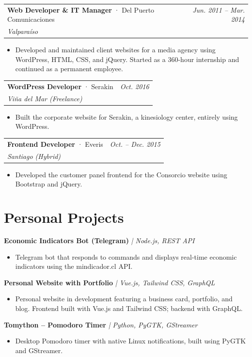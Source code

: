 \documentclass[11pt, a4paper]{article}
\makeatletter
\newcommand{\entry}[4]{%
  \vspace{6pt}
  \begin{tabularx}{\textwidth}{@{}X r@{}}
    \textbf{#1} \textcolor{gris}{· #2} & \textcolor{grisClaro}{\small\textit{#4}} \\
    \textcolor{grisClaro}{\small\textit{#3}} & \\
  \end{tabularx}
  \vspace{2pt}
}
\newcommand{\project}[2]{%
  \vspace{6pt}
  \textbf{#1} \quad \textcolor{gris}{\small\textit{| #2}}
  \vspace{2pt}
}
\makeatother
\begin{document}
\entry{Web Developer \& IT Manager}{Del Puerto Comunicaciones}{Valpara\'iso}{Jun. 2011 -- Mar. 2014}
\begin{itemize}
  \item Developed and maintained client websites for a media agency using WordPress, HTML, CSS, and jQuery. Started as a 360-hour internship and continued as a permanent employee.
\end{itemize}
 
\entry{WordPress Developer}{Serakin}{Vi\~na del Mar (Freelance)}{Oct. 2016}
\begin{itemize}
  \item Built the corporate website for Serakin, a kinesiology center, entirely using WordPress.
\end{itemize}
 
\entry{Frontend Developer}{Everis}{Santiago (Hybrid)}{Oct. -- Dec. 2015}
\begin{itemize}
  \item Developed the customer panel frontend for the Consorcio website using Bootstrap and jQuery.
\end{itemize}
 
\section{Personal Projects}
 
\project{Economic Indicators Bot (Telegram)}{Node.js, REST API}
\begin{itemize}
  \item Telegram bot that responds to commands and displays real-time economic indicators using the mindicador.cl API.
\end{itemize}
 
\project{Personal Website with Portfolio}{Vue.js, Tailwind CSS, GraphQL}
\begin{itemize}
  \item Personal website in development featuring a business card, portfolio, and blog. Frontend built with Vue.js and Tailwind CSS; backend with GraphQL.
\end{itemize}
 
\project{Tomython -- Pomodoro Timer}{Python, PyGTK, GStreamer}
\begin{itemize}
  \item Desktop Pomodoro timer with native Linux notifications, built using PyGTK and GStreamer.
\end{itemize}
 
\end{document}
